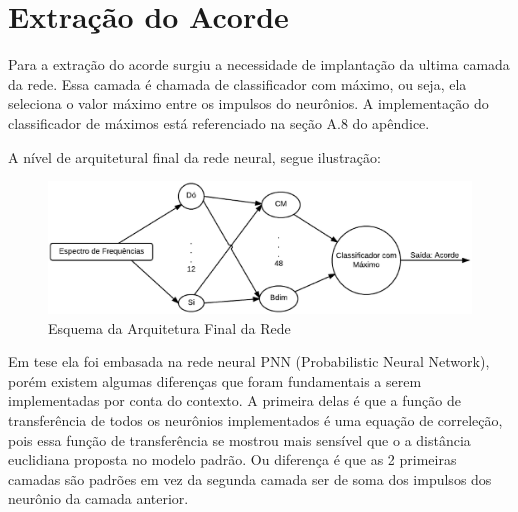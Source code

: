 \section{Extração do Acorde}
\label{sec:extracaoacorde}

Para a extração do acorde surgiu a necessidade de implantação da ultima camada da rede. Essa camada é chamada de classificador com máximo, ou seja, ela seleciona o valor máximo entre os impulsos do neurônios. A implementação do classificador de máximos está referenciado na seção A.8 do apêndice.

A nível de arquitetural final da rede neural, segue ilustração: 

\begin{figure}[h]
	\centering
		\includegraphics[keepaspectratio=true,scale=0.45]{figuras/rede_total}
	\caption{Esquema da Arquitetura Final da Rede}
\end{figure}

Em tese ela foi embasada na rede neural PNN (Probabilistic Neural Network), porém existem algumas diferenças que foram fundamentais a serem implementadas por conta do contexto. A primeira delas é que a função de transferência de todos os neurônios implementados é uma equação de correleção, pois essa função de transferência se mostrou mais sensível que o a distância euclidiana proposta no modelo padrão. Ou diferença é que as 2 primeiras camadas são padrões em vez da segunda camada ser de soma dos impulsos dos neurônio da camada anterior. 